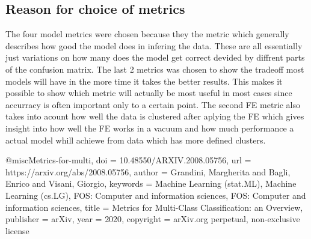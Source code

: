 \subsection{Reason for choice of metrics}
The four model metrics were chosen because they the metric which generally describes how good the model does in infering the data. These are all essentially just variations on 
how many does the model get correct devided by diffrent parts of the confusion matrix. The last 2 metrics was chosen to show the tradeoff most models will have in the more time it takes the better results. This makes it possible to show which metric will actually be most useful in most cases since accurracy is often important only to a certain point. The second FE metric also takes into acount how well the data is clustered after aplying the FE which gives insight into how well the FE works in a vacuum and how much performance a actual model whill achiewe from data which has more defined clusters.


@misc{Metrics-for-multi,
  doi = {10.48550/ARXIV.2008.05756},
  url = {https://arxiv.org/abs/2008.05756},
  author = {Grandini, Margherita and Bagli, Enrico and Visani, Giorgio},
  keywords = {Machine Learning (stat.ML), Machine Learning (cs.LG), FOS: Computer and information sciences, FOS: Computer and information sciences},
  title = {Metrics for Multi-Class Classification: an Overview},
  publisher = {arXiv},
  year = {2020},
  copyright = {arXiv.org perpetual, non-exclusive license}
}
